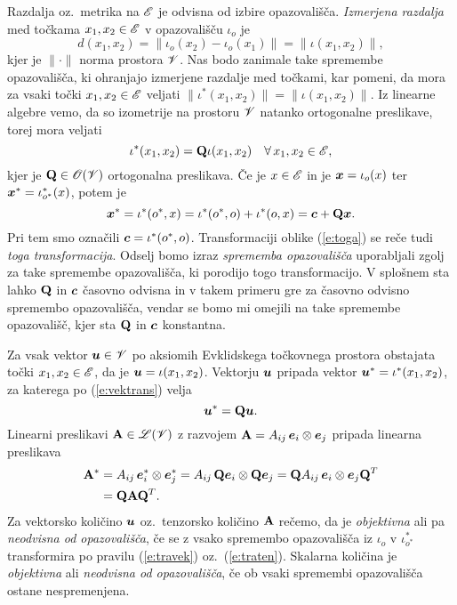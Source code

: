 Razdalja oz.~metrika na $\mathscr E$ je odvisna od izbire opazovališča. \emph{Izmerjena razdalja} med točkama
$x_1,x_2\in\mathscr E$ v opazovališču $\iota_o$ je
\[ d(x_1,x_2)=\|\iota_o(x_2)-\iota_o(x_1)\|=\|\iota(x_1,x_2)\|, \]
kjer je $\|\cdot\|$ norma prostora $\mathscr V$. Nas bodo zanimale take
spremembe opazovališča, ki ohranjajo izmerjene razdalje med točkami, kar pomeni,
da mora za vsaki točki $x_1,x_2\in\mathscr E$ veljati
$\|\iota^*(x_1,x_2)\|=\|\iota(x_1,x_2)\|$.
Iz linearne algebre vemo, da so izometrije na prostoru $\mathscr V$ natanko ortogonalne preslikave,
torej mora veljati
\begin{equation} \label{e:vektrans}
	\iota^*(x_1,x_2)=\mathbf Q\iota(x_1,x_2)\quad\forall\, x_1,x_2\in\mathscr E,
\end{equation}
kjer je $\mathbf Q\in\mathscr{O}(\mathscr V)$ ortogonalna preslikava. Če je $x\in\mathscr E$ in
je $\boldsymbol x=\iota_o(x)$ ter $\boldsymbol x^*=\iota^*_{o^*}(x)$, potem je
\begin{equation} \label{e:toga}
	\boldsymbol x^*=\iota^*(o^*,x)=\iota^*(o^*,o)+\iota^*(o,x)=\boldsymbol c+\mathbf Q\boldsymbol x.
\end{equation}
Pri tem smo označili $\boldsymbol c=\iota^*(o^*,o)$. Transformaciji oblike (\ref{e:toga})
se reče tudi \emph{toga transformacija}. Odselj bomo izraz \textit{sprememba opazovališča}
uporabljali zgolj za take spremembe opazovališča, ki porodijo togo transformacijo.
V splošnem sta lahko $\mathbf Q$ in $\boldsymbol c$ časovno odvisna in v takem primeru
gre za časovno odvisno spremembo opazovališča, vendar se bomo mi omejili na
take spremembe opazovališč, kjer sta $\mathbf Q$ in $\boldsymbol c$ konstantna.

Za vsak vektor $\boldsymbol u\in\mathscr V$ po aksiomih Evklidskega točkovnega prostora obstajata
točki $x_1,x_2\in\mathscr E$, da je $\boldsymbol u=\iota(x_1,x_2)$. Vektorju $\boldsymbol u$ pripada
vektor $\boldsymbol u^*=\iota^*(x_1,x_2)$, za katerega po (\ref{e:vektrans}) velja
\begin{equation} \label{e:travek}
	\boldsymbol u^*=\mathbf Q\boldsymbol u.
\end{equation}
Linearni preslikavi $\mathbf A\in\mathscr L(\mathscr V)$ z razvojem $\mathbf A=A_{ij}\,\boldsymbol e_i\otimes\boldsymbol e_j$
pripada linearna preslikava
\begin{align}
	\mathbf A^*&=A_{ij}\,\boldsymbol e^*_i\otimes\boldsymbol e^*_j=A_{ij}\,\mathbf Q\boldsymbol e_i\otimes\mathbf Q\boldsymbol e_j
	=\mathbf QA_{ij}\,\boldsymbol e_i\otimes\boldsymbol e_j\mathbf Q^T \nonumber \\
	&=\mathbf Q\mathbf A\mathbf Q^T. \label{e:traten}
\end{align}
Za vektorsko količino $\boldsymbol u$ oz.~tenzorsko količino $\mathbf A$
rečemo, da je \emph{objektivna} ali pa \emph{neodvisna od opazovališča},
če se z vsako spremembo opazovališča iz $\iota_o$ v $\iota^*_{o^*}$
transformira po pravilu (\ref{e:travek}) oz.~(\ref{e:traten}).
Skalarna količina je \emph{objektivna} ali \emph{neodvisna od opazovališča},
če ob vsaki spremembi opazovališča ostane nespremenjena.

